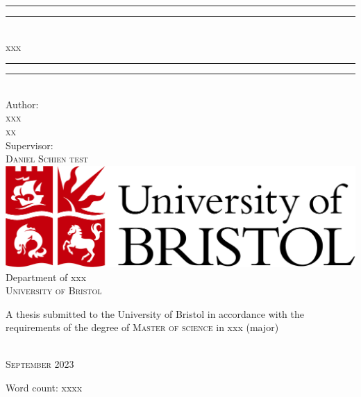 \begin{titlepage}

\vspace*{13mm}

\begin{center}
\rule[0.5ex]{\linewidth}{2pt}\vspace*{-\baselineskip}\vspace*{3.2pt}
\rule[0.5ex]{\linewidth}{1pt}\\[\baselineskip]
{\LARGE xxx}\\[4mm]
\rule[0.5ex]{\linewidth}{1pt}\vspace*{-\baselineskip}\vspace{3.2pt}
\rule[0.5ex]{\linewidth}{2pt}\\

\vspace{6.5mm}
{\large Author: \\
\textsc{xxx}\\
\textsc{xx}}\\

\vspace{6.5mm}
{\large Supervisor: \\
\textsc{Daniel Schien test}}\\

\vspace{11mm}
\includegraphics[scale=0.2]{logos/bristollogo_colour}\\
\vspace{6mm}
{\large Department of xxx\\
\vspace{6mm}
\textsc{University of Bristol}}\\
\vspace{6mm}
\begin{minipage}{10cm}
A thesis submitted to the University of Bristol in accordance with the requirements of the degree of \textsc{Master of science} in xxx (major)
\end{minipage}\\
\vspace{11mm}
{\large\textsc{September 2023}}
\vspace{11mm}
\end{center}

\begin{flushright}
{\small Word count: xxxx}
\end{flushright}

\end{titlepage}